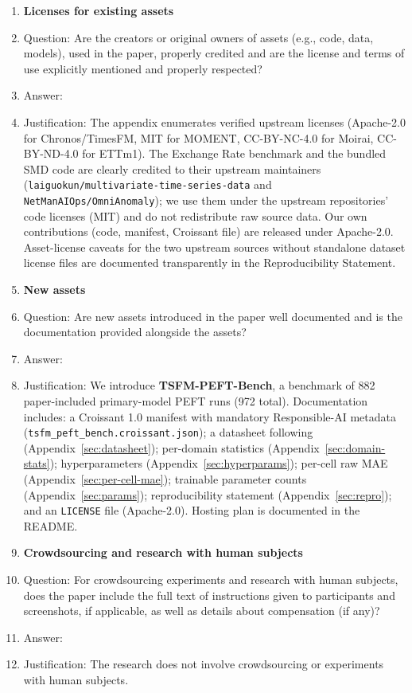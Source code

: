 \begin{enumerate}
\item {\bf Licenses for existing assets}
    \item[] Question: Are the creators or original owners of assets (e.g., code, data, models), used in the paper, properly credited and are the license and terms of use explicitly mentioned and properly respected?
    \item[] Answer: \answerYes{}
    \item[] Justification: The appendix enumerates verified upstream licenses (Apache-2.0 for Chronos/TimesFM, MIT for MOMENT, CC-BY-NC-4.0 for Moirai, CC-BY-ND-4.0 for ETTm1). The Exchange Rate benchmark and the bundled SMD code are clearly credited to their upstream maintainers (\texttt{laiguokun/multivariate-time-series-data} and \texttt{NetManAIOps/OmniAnomaly}); we use them under the upstream repositories' code licenses (MIT) and do not redistribute raw source data. Our own contributions (code, manifest, Croissant file) are released under Apache-2.0. Asset-license caveats for the two upstream sources without standalone dataset license files are documented transparently in the Reproducibility Statement.

\item {\bf New assets}
    \item[] Question: Are new assets introduced in the paper well documented and is the documentation provided alongside the assets?
    \item[] Answer: \answerYes{}
    \item[] Justification: We introduce \textbf{TSFM-PEFT-Bench}, a benchmark of 882 paper-included primary-model PEFT runs (972 total). Documentation includes: a Croissant 1.0 manifest with mandatory Responsible-AI metadata (\texttt{tsfm\_peft\_bench.croissant.json}); a datasheet following~\citet{gebru2021datasheets} (Appendix~\ref{sec:datasheet}); per-domain statistics (Appendix~\ref{sec:domain-stats}); hyperparameters (Appendix~\ref{sec:hyperparams}); per-cell raw MAE (Appendix~\ref{sec:per-cell-mae}); trainable parameter counts (Appendix~\ref{sec:params}); reproducibility statement (Appendix~\ref{sec:repro}); and an \texttt{LICENSE} file (Apache-2.0). Hosting plan is documented in the README.

\item {\bf Crowdsourcing and research with human subjects}
    \item[] Question: For crowdsourcing experiments and research with human subjects, does the paper include the full text of instructions given to participants and screenshots, if applicable, as well as details about compensation (if any)?
    \item[] Answer: \answerNA{}
    \item[] Justification: The research does not involve crowdsourcing or experiments with human subjects.


\end{enumerate}

